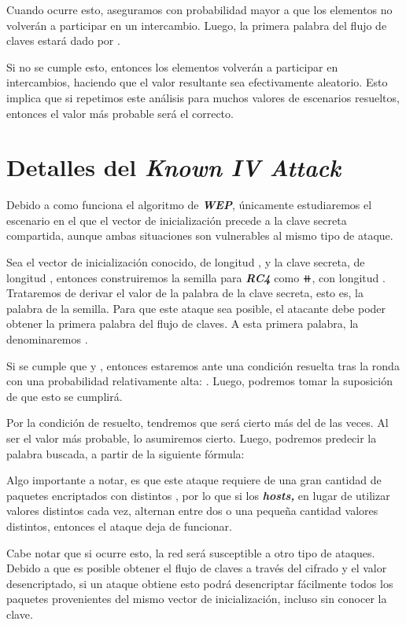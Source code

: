 \documentclass[
]{article}
\begin{document}
Cuando ocurre esto, aseguramos con probabilidad mayor a {} que los
elementos {} no volverán a participar en un intercambio. Luego, la
primera palabra del flujo de claves estará dado por {}.

Si no se cumple esto, entonces los elementos volverán a participar en
intercambios, haciendo que el valor resultante sea efectivamente
aleatorio. Esto implica que si repetimos este análisis para muchos
valores de escenarios resueltos, entonces el valor más probable será el
correcto.

\hypertarget{detalles-del-known-iv-attack}{%
\section{\texorpdfstring{Detalles del \textbf{\emph{Known IV
Attack}}}{Detalles del Known IV Attack}}\label{detalles-del-known-iv-attack}}

Debido a como funciona el algoritmo de \textbf{\emph{WEP}}, únicamente
estudiaremos el escenario en el que el vector de inicialización precede
a la clave secreta compartida, aunque ambas situaciones son vulnerables
al mismo tipo de ataque.

Sea {} el vector de inicialización conocido, de longitud {}, y {} la
clave secreta, de longitud {}, entonces construiremos la semilla para
\textbf{\emph{RC4}} como {⧺}, con longitud {}. Trataremos de derivar el
valor de la palabra {} de la clave secreta, esto es, la palabra {} de la
semilla. Para que este ataque sea posible, el atacante debe poder
obtener la primera palabra del flujo de claves. A esta primera palabra,
la denominaremos {}.

Si se cumple que {} y {}, entonces estaremos ante una condición resuelta
tras la ronda {} con una probabilidad relativamente alta: {}. Luego,
podremos tomar la suposición de que esto se cumplirá.

Por la condición de resuelto, tendremos que {} será cierto más del {} de
las veces. Al ser el valor más probable, lo asumiremos cierto. Luego,
podremos predecir la palabra buscada, a partir de la siguiente fórmula:

Algo importante a notar, es que este ataque requiere de una gran
cantidad de paquetes encriptados con distintos {}, por lo que si los
\textbf{\emph{hosts,}} en lugar de utilizar valores distintos cada vez,
alternan entre dos o una pequeña cantidad valores distintos, entonces el
ataque deja de funcionar.

Cabe notar que si ocurre esto, la red será susceptible a otro tipo de
ataques. Debido a que es posible obtener el flujo de claves a través del
cifrado y el valor desencriptado, si un ataque obtiene esto podrá
desencriptar fácilmente todos los paquetes provenientes del mismo vector
de inicialización, incluso sin conocer la clave.
\end{document}
